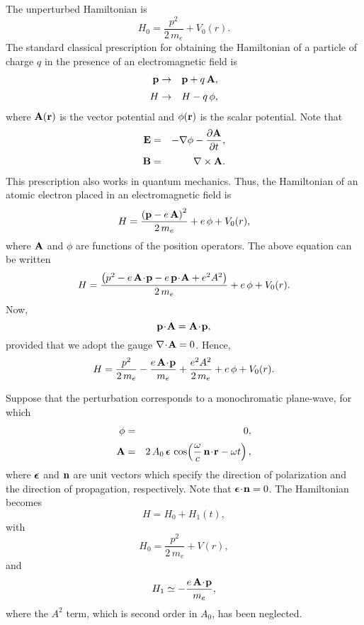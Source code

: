 The unperturbed Hamiltonian
is
\begin{equation}\label{e6.239}
H_0 = \frac{p^2}{2 \,m_e} + V_0(r).
\end{equation}
The standard classical prescription for obtaining the Hamiltonian of
a  particle
of charge $q$
in the presence of an electromagnetic field is
\begin{eqnarray}
{\bf p} &\rightarrow& {\bf p} + q\,{ \bf A},\\[0.5ex]
H &\rightarrow & H - q\,\phi,
\end{eqnarray}
where ${\bf A}(\bf r)$ is the vector potential and $\phi({\bf r})$
is the scalar potential. Note that
\begin{eqnarray}
{\bf E} &=&  - \nabla\phi - \frac{\partial {\bf A}}{\partial t},\\[0.5ex]
{\bf B} &=& \nabla\times {\bf A}.
\end{eqnarray}
This prescription also works in quantum mechanics. Thus, the Hamiltonian
of an atomic electron placed in an electromagnetic field is
\begin{equation}
H = \frac{\left({\bf p} - e\, {\bf A}\right)^2 }{2\,m_e}+ e \,\phi + V_0(r),
\end{equation}
where ${\bf A}$ and $\phi$ are functions of the position operators.
The above equation can be written
\begin{equation}
H = \frac{ \left(p^2 -e \,{\bf A}\!\cdot \! {\bf p}
-e \,{\bf p}\!\cdot\!{\bf A} + e^2 A^2\right)}{2\,m_e}+ e \,\phi + V_0(r).
\end{equation}
Now, 
\begin{equation}
{\bf p}\!\cdot\!{\bf A} = {\bf A}\!\cdot \! {\bf p},
\end{equation}
provided that we adopt the gauge $\nabla\!\cdot\!{\bf A} = 0$.
Hence,
\begin{equation}
H = \frac{p^2}{2\,m_e} -\frac{e\,{\bf A}\!\cdot\!{\bf p}}{m_e}
+\frac{ e^2  A^2}{2\,m_e}+ e\, \phi + V_0(r).
\end{equation}

Suppose that the perturbation corresponds to a monochromatic plane-wave, for which
\begin{eqnarray}
\phi &=& 0,\\[0.5ex]
{\bf A} &=& 2\, A_0 \,\mbox{\boldmath$\epsilon$}\,\cos\!\left
(\frac{\omega}{c} \,{\bf n}\!\cdot\!{\bf r}
- \omega t\right),
\end{eqnarray}
where $\mbox{\boldmath$\epsilon$}$ and ${\bf n}$ are unit vectors which specify the direction
of polarization and the direction of propagation, respectively. 
Note that $\mbox{\boldmath$\epsilon$}\!\cdot\!{\bf n} = 0$. The Hamiltonian
becomes
\begin{equation}
H = H_0 + H_1(t),
\end{equation}
with
\begin{equation}
H_0 = \frac{p^2}{2\,m_e}  + V(r),
\end{equation}
and
\begin{equation}
H_1 \simeq -\frac{e\,{\bf A}\!\cdot\!{\bf p}}{m_e},
\end{equation}
where the $A^2$ term, which is  second order in $A_0$, has been neglected.

